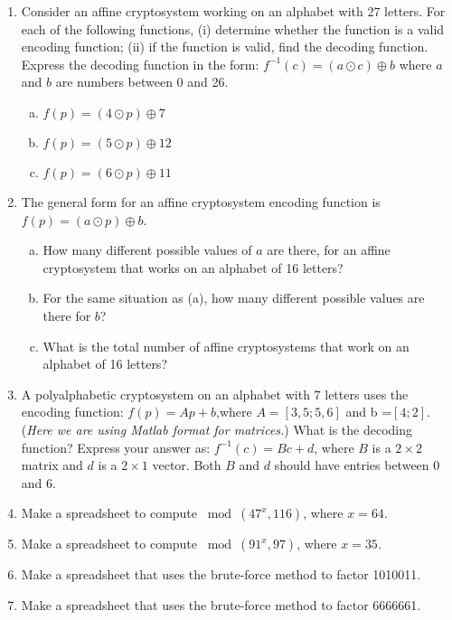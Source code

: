 \begin{enumerate}
\item 
Consider an affine cryptosystem working on an alphabet with 27 letters. For each of the following functions, (i) determine whether the  function is a valid encoding function; (ii) if the function is valid, find the decoding function. Express the decoding function in the form: $f^{-1}(c) = (a\odot c) \oplus b$ where $a$ and $b$ are numbers between 0 and 26.
\begin{enumerate}[(a)]
\item
$f(p) = (4 \odot p) \oplus 7$
\item	
$f(p) = (5 \odot p) \oplus 12$ 
\item
$f(p) = (6 \odot p) \oplus  11$
\end{enumerate}

\item
The general form for an affine cryptosystem encoding function is $f(p) =(a\odot p) \oplus b$.
\begin{enumerate}[(a)]
\item
 How many different possible values of $a$ are there, for an affine cryptosystem that works on  an alphabet of 16 letters?
\item	
For the same situation as (a), how many different possible values are there for $b$?
\item	
What is the total number of affine cryptosystems that work on an alphabet of 16 letters?
\end{enumerate}

\item
A polyalphabetic cryptosystem on an alphabet with 7 letters uses the encoding function:
$f(p)= Ap + b$,where $A=[3 , 5; 5, 6]$ and b =$ [4 ; 2]$. (\emph{Here we are using Matlab format for matrices.})  
What is the decoding function? Express your answer as:  $ f^{-1}(c) = Bc + d$, where $B$  is a $2\times 2$ matrix and $d$ is a $2 \times 1$ vector.  Both $B$ and $d$ should have entries between 0 and 6.

\item	
Make a spreadsheet to compute  $\bmod(47^x, 116)$, where $x = 64$.

\item
Make a spreadsheet to compute $\bmod(91^x, 97)$, where $x = 35$.

\item	
Make a spreadsheet that uses the brute-force method to factor 1010011.

\item	
Make a spreadsheet that uses the brute-force method to factor 6666661.


\end{enumerate}
